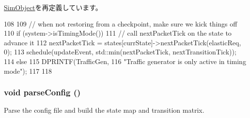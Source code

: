 \hyperlink{classSimObject_a3c34ea9b29f410748d4435a667484924}{SimObject}を再定義しています。


\begin{DoxyCode}
108 {
109     // when not restoring from a checkpoint, make sure we kick things off
110     if (system->isTimingMode()) {
111         // call nextPacketTick on the state to advance it
112         nextPacketTick = states[currState]->nextPacketTick(elasticReq, 0);
113         schedule(updateEvent, std::min(nextPacketTick, nextTransitionTick));
114     } else {
115         DPRINTF(TrafficGen,
116                 "Traffic generator is only active in timing mode\n");
117     }
118 }
\end{DoxyCode}
\hypertarget{classTrafficGen_a7719d247662a43429aac025090db5704}{
\subsubsection[{parseConfig}]{\setlength{\rightskip}{0pt plus 5cm}void parseConfig ()}}
\label{classTrafficGen_a7719d247662a43429aac025090db5704}
Parse the config file and build the state map and transition matrix. 


